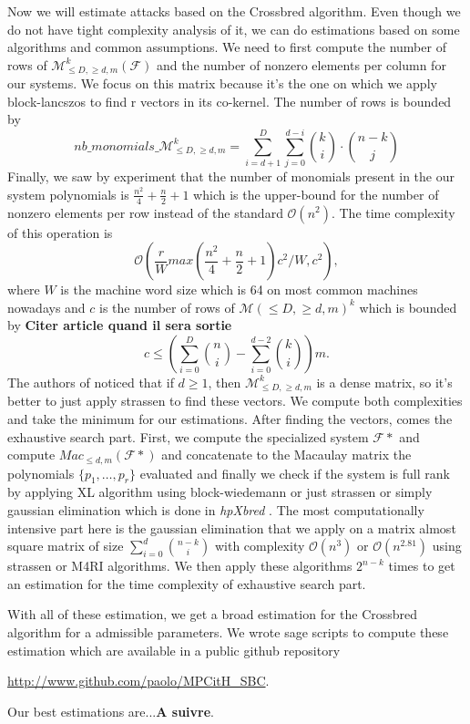 \documentclass[english]{article}
\begin{document}
		Now we will estimate attacks based on the Crossbred algorithm. Even though we do not have tight complexity analysis of it, we can do estimations based on some algorithms and common assumptions.
		We need to first compute the number of rows of $\mathcal{M}_{\leq D, \geq d, m}^k(\mathcal{F})$ and the number of nonzero elements per column for our systems. We focus on this matrix because it's the one on which we apply block-lancszos to find r vectors in its co-kernel.
		The number of rows is bounded by $$nb\_monomials\_\mathcal{M}_{\leq D, \geq d, m}^k = \sum_{i=d+1}^{D}\sum_{j=0}^{d-i} \binom{k}{i} \cdot \binom{n-k}{j}$$
		Finally, we saw by experiment that the number of monomials present in the our system polynomials is $\frac{n^2}{4} + \frac{n}{2} + 1$ which is the upper-bound for the number of nonzero elements per row instead of the standard $\mathcal{O}(n^2)$. The time complexity of this operation is 
		$$
		\mathcal{O}\left(\frac{r}{W}max(\frac{n^2}{4} + \frac{n}{2} + 1)c^2/W, c^2\right),
		$$
		where $W$ is the machine word size which is 64 on most common machines nowadays and $c$ is the number of rows of $\mathcal{M}(\leq D, \geq d, m)^k$ which is bounded by \textbf{Citer article quand il sera sortie}
		$$
			c \leq \left(\sum_{i=0}^{D}\binom{n}{i} - \sum_{i=0}^{d-2}\binom{k}{i}\right)m.
		$$
		The authors of \cite{MQOMv2} noticed that if $d \geq 1$, then $\mathcal{M}_{\leq D, \geq d, m}^k$ is a dense matrix, so it's better to just apply strassen to find these vectors. We compute both complexities and take the minimum for our estimations.
		After finding the vectors, comes the exhaustive search part. First, we compute the specialized system $\mathcal{F}*$ and compute $Mac_{\leq d, m}(\mathcal{F}*)$ and concatenate to the Macaulay matrix the polynomials $\{p_1,\dots,p_r\}$ evaluated and finally we check if the system is full rank by applying XL algorithm using block-wiedemann or just strassen or simply gaussian elimination which is done in \textit{hpXbred} \cite{BS23}. The most computationally intensive part here is the gaussian elimination that we apply on a matrix almost square matrix of size $\sum_{i=0}^{d}\binom{n-k}{i}$ with complexity $\mathcal{O}(n^3)$ or $\mathcal{O}(n^{2.81})$ using strassen or M4RI algorithms. We then apply these algorithms $2^{n-k}$ times to get an estimation for the time complexity of exhaustive search part.
		
		With all of these estimation, we get a broad estimation for the Crossbred algorithm for a admissible parameters. We wrote sage scripts to compute these estimation which are available in a public github repository
		\begin{center}
			\href{http://www.github.com/paolo/MPCitH_SBC}{http://www.github.com/paolo/MPCitH\_SBC}.
		\end{center}
		Our best estimations are...\textbf{A suivre}.
		
\end{document}

